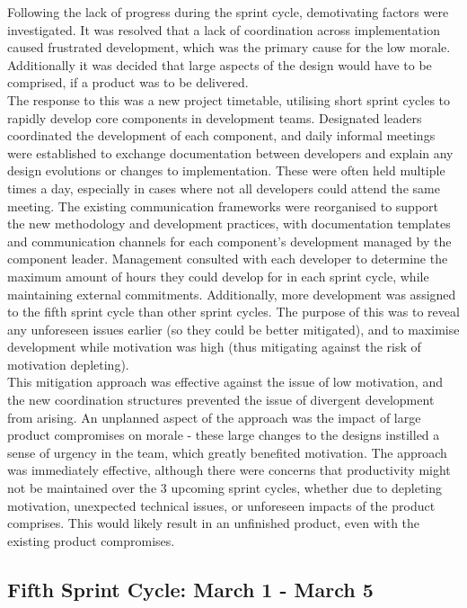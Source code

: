 \documentclass[9pt, titlepage]{extarticle}
\begin{document}
Following the lack of progress during the sprint cycle, demotivating factors were investigated. It was resolved that a lack of coordination across implementation caused frustrated development, which was the primary cause for the low morale. Additionally it was decided that large aspects of the design would have to be comprised, if a product was to be delivered.\\

The response to this was a new project timetable, utilising short sprint cycles to rapidly develop core components in development teams. Designated leaders coordinated the development of each component, and daily informal meetings were established to exchange documentation between developers and explain any design evolutions or changes to implementation. These were often held multiple times a day, especially in cases where not all developers could attend the same meeting. The existing communication frameworks were reorganised to support the new methodology and development practices, with documentation templates and communication channels for each component's development managed by the component leader. Management consulted with each developer to determine the maximum amount of hours they could develop for in each sprint cycle, while maintaining external commitments. Additionally, more development was assigned to the fifth sprint cycle than other sprint cycles. The purpose of this was to reveal any unforeseen issues earlier (so they could be better mitigated), and to maximise development while motivation was high (thus mitigating against the risk of motivation depleting).\\

This mitigation approach was effective against the issue of low motivation, and the new coordination structures prevented the issue of divergent development from arising. An unplanned aspect of the approach was the impact of large product compromises on morale - these large changes to the designs instilled a sense of urgency in the team, which greatly benefited motivation. The approach was immediately effective, although there were concerns that productivity might not be maintained over the 3 upcoming sprint cycles, whether due to depleting motivation, unexpected technical issues, or unforeseen impacts of the product comprises. This would likely result in an unfinished product, even with the existing product compromises.

\subsection{Fifth Sprint Cycle: March 1 - March 5}
\end{document}
